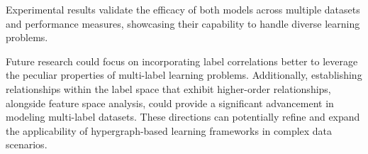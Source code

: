 \documentclass[12pt,a4paper,oneside,english]{report}
\begin{document}
Experimental results validate the efficacy of both models across multiple datasets and performance measures, showcasing their capability to handle diverse learning problems.

Future research could focus on incorporating label correlations better to leverage the peculiar properties of multi-label learning problems. Additionally, establishing relationships within the label space that exhibit higher-order relationships, alongside feature space analysis, could provide a significant advancement in modeling multi-label datasets. These directions can potentially refine and expand the applicability of hypergraph-based learning frameworks in complex data scenarios.






%


\end{document}
